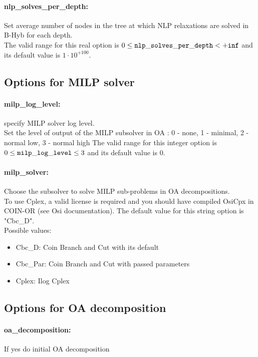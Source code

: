 \paragraph{nlp\_solves\_per\_depth:}\label{sec:nlp_solves_per_depth} Set average number of nodes in the tree at which NLP relaxations are solved in B-Hyb for each depth. $\;$ \\
 The valid range for this real option is 
$0 \le {\tt nlp\_solves\_per\_depth } <  {\tt +inf}$
and its default value is $1 \cdot 10^{+100}$.


\subsection{Options for MILP solver}
\label{sec:Options_for_MILP_solver}
\paragraph{milp\_log\_level:}\label{sec:milp_log_level} specify MILP solver log level. $\;$ \\
 Set the level of output of the MILP subsolver in
OA : 0 - none, 1 - minimal, 2 - normal low, 3 -
normal high The valid range for this integer option is
$0 \le {\tt milp\_log\_level } \le 3$
and its default value is $0$.


\paragraph{milp\_solver:}\label{sec:milp_solver} Choose the subsolver to solve MILP sub-problems in OA decompositions. $\;$ \\
  To use Cplex, a valid license is required and
you should have compiled OsiCpx in COIN-OR  (see
Osi documentation).
The default value for this string option is "Cbc\_D".
\\ 
Possible values:
\begin{itemize}
   \item Cbc\_D: Coin Branch and Cut with its default
   \item Cbc\_Par: Coin Branch and Cut with passed parameters
   \item Cplex: Ilog Cplex
\end{itemize}

\subsection{Options for OA decomposition}
\label{sec:Options_for_OA_decomposition}
\paragraph{oa\_decomposition:}\label{sec:oa_decomposition} If yes do initial OA decomposition $\;$ \\


